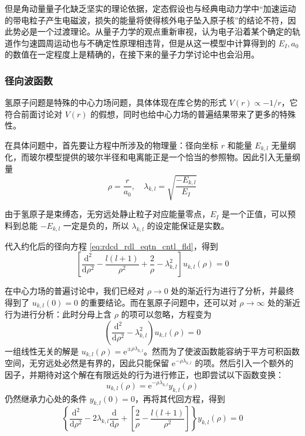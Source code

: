 \documentclass[cn,10pt,math=newtx,citestyle=gb7714-2015,bibstyle=gb7714-2015]{elegantbook}
\def\d{\mathrm d}
\def\e{\mathrm e}
\def\ra{\rightarrow}
\begin{document}
但是角动量量子化缺乏坚实的理论依据，定态假设也与经典电动力学中“加速运动的带电粒子产生电磁波，损失的能量将使得核外电子坠入原子核”的结论不符，因此势必是一个过渡理论。从量子力学的观点重新审视，认为电子沿着某个确定的轨道作匀速圆周运动也与不确定性原理相违背，但是从这一模型中计算得到的 $E_I,a_0$ 的数值在一定程度上是精确的，在接下来的量子力学讨论中也会沿用。

\subsubsection{径向波函数}

氢原子问题是特殊的中心力场问题，具体体现在库仑势的形式 $V(r)\propto -1/r$，它符合前面讨论对 $V(r)$ 的假想，同时也给中心力场的普遍结果带来了更多的特殊性。

在具体问题中，首先要让方程中所涉及的物理量：径向坐标 $r$ 和能量 $E_{k,l}$ 无量纲化，而玻尔模型提供的玻尔半径和电离能正是一个恰当的参照物。因此引入无量纲量
\begin{equation*}
    \rho = \frac r {a_0},\quad \lambda_{k,l} = \sqrt{\frac{-E_{k,l}}{E_I}}
\end{equation*}
\begin{remark}
由于氢原子是束缚态，无穷远处静止粒子对应能量零点，$E_I$ 是一个正值，可以预料到总能 $-E_{k,l}$ 一定是负的，所以 $\lambda_{k,l}$ 的设定能保证是实数。
\end{remark}

代入约化后的径向方程 \ref{eq:rdcd_rdl_eqtn_cntl_fld}，得到
\begin{equation}
    \left[\frac{\d^2}{\d\rho^2}-\frac{l(l+1)}{\rho^2}+\frac 2\rho-\lambda_{k,l}^2\right]u_{k,l}(\rho)=0
\end{equation}

在中心力场的普遍讨论中，我们已经对 $\rho\ra0$ 处的渐近行为进行了分析，并最终得到了 $u_{k,l}(0)=0$ 的重要结论。而在氢原子问题中，还可以对 $\rho\ra\infty$ 处的渐近行为进行分析：此时分母上含 $\rho$ 的项可以忽略，方程变为
\begin{equation}
    \left(\frac{\d^2}{\d\rho^2}-\lambda_{k,l}^2\right)u_{k,l}(\rho)=0
\end{equation}
一组线性无关的解是 $u_{k,l}(\rho)=\e^{\pm\rho\lambda_{k,l}}$。然而为了使波函数能容纳于平方可积函数空间，无穷远处必然是有界的，因此只能保留 $\e^{-\rho\lambda_{k,l}}$ 的项。然后引入一个额外的因子，并期待对这个解在有限远处的行为进行修正，也即尝试以下函数变换：
\begin{equation}
    u_{k,l}(\rho)=\e^{-\rho\lambda_{k,l}}y_{k,l}(\rho)
\end{equation}
仍然继承力心处的条件 $y_{k,l}(0)=0$，再将其代回方程，得到
\begin{equation}
    \left\{\frac{\d^2}{\d\rho^2}-2\lambda_{k,l}\frac{\d}{\d\rho}+\left[\frac 2\rho-\frac{l(l+1)}{\rho^2}\right]\right\}y_{k,l}(\rho)=0
\end{equation}
\end{document}
